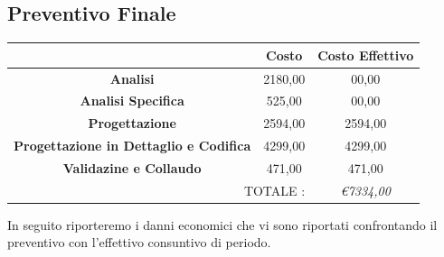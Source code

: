 \documentclass[12pt,a4paper,titlepage]{article}
\begin{document}
\subsection{Preventivo Finale}
{\renewcommand\arraystretch{1.2} %
\begin{tabular}{|c|c|c|}
	\hline 
	& \textbf{Costo} & \textbf{Costo Effettivo} \\ 
	\hline 
	\textbf{Analisi} & 2180,00 & 00,00 \\ 
	\hline 
	\textbf{Analisi Specifica} & 525,00 & 00,00 \\ 
	\hline 
	\textbf{Progettazione} & 2594,00 & 2594,00 \\ 
	\hline 
	\textbf{Progettazione in Dettaglio e Codifica} & 4299,00 & 4299,00 \\ 
	\hline 
	\textbf{Validazine e Collaudo} & 471,00 & 471,00 \\ 
	\hline 
	\multicolumn{2}{r|}{TOTALE :} & \textit{\euro 7334,00 } \\ 
\end{tabular}
} 
\vspace{0.5cm}

In seguito riporteremo i danni economici che vi sono riportati confrontando il preventivo con l'effettivo consuntivo di periodo.
\end{document}
